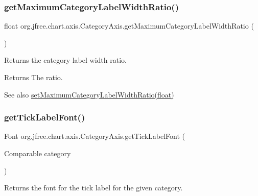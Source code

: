 \subsubsection{\texorpdfstring{get\+Maximum\+Category\+Label\+Width\+Ratio()}{getMaximumCategoryLabelWidthRatio()}}
{\footnotesize\ttfamily float org.\+jfree.\+chart.\+axis.\+Category\+Axis.\+get\+Maximum\+Category\+Label\+Width\+Ratio (\begin{DoxyParamCaption}{ }\end{DoxyParamCaption})}

Returns the category label width ratio.

\begin{DoxyReturn}{Returns}
The ratio.
\end{DoxyReturn}
\begin{DoxySeeAlso}{See also}
\mbox{\hyperlink{classorg_1_1jfree_1_1chart_1_1axis_1_1_category_axis_a24e3faae5e1ef3bd29147892dda79c27}{set\+Maximum\+Category\+Label\+Width\+Ratio(float)}} 
\end{DoxySeeAlso}
\mbox{\label{classorg_1_1jfree_1_1chart_1_1axis_1_1_category_axis_a6b5dd23193a2c21cc442ca4bbfe6be48}} 
\subsubsection{\texorpdfstring{get\+Tick\+Label\+Font()}{getTickLabelFont()}}
{\footnotesize\ttfamily Font org.\+jfree.\+chart.\+axis.\+Category\+Axis.\+get\+Tick\+Label\+Font (\begin{DoxyParamCaption}\item[{Comparable}]{category }\end{DoxyParamCaption})}

Returns the font for the tick label for the given category.


